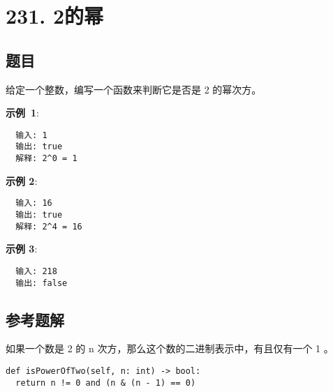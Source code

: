 \newpage
\section{231. 2的幂}
\label{leetcode:231}

\subsection{题目}

给定一个整数，编写一个函数来判断它是否是 2 的幂次方。

\textbf{示例 1}:

\begin{verbatim}
  输入: 1
  输出: true
  解释: 2^0 = 1
\end{verbatim}

\textbf{示例 2}:

\begin{verbatim}
  输入: 16
  输出: true
  解释: 2^4 = 16
\end{verbatim}

\textbf{示例 3}:

\begin{verbatim}
  输入: 218
  输出: false
\end{verbatim}

\subsection{参考题解}

如果一个数是 2 的 n 次方，那么这个数的二进制表示中，有且仅有一个 1 。

\begin{verbatim}
def isPowerOfTwo(self, n: int) -> bool:
  return n != 0 and (n & (n - 1) == 0)
\end{verbatim}

